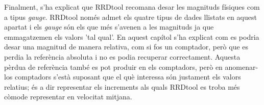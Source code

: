 Finalment, s'ha explicat que RRDtool recomana desar les magnituds físiques com a tipus \emph{gauge}. RRDtool només admet els quatre tipus de dades llistats en aquest apartat i els  \emph{gauge} són els que més s'avenen a les magnituds ja que emmagatzemen els valors 'tal qual'. En aquest capítol s'ha explicat com es podria desar una magnitud de manera relativa, com si fos un comptador, però que es perdia la referència absoluta i no es podia recuperar correctament. Aquesta pèrdua de referència també es pot produir en els comptadors,  però en anomenar-los comptadors s'està suposant que el què interessa són justament els valors relatius; és a dir representar els increments als quals RRDtool es troba més còmode representar en velocitat mitjana.







